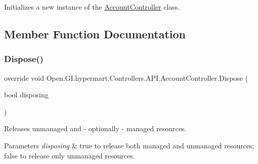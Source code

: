 Initializes a new instance of the \hyperlink{class_open_1_1_g_i_1_1hypermart_1_1_controllers_1_1_a_p_i_1_1_account_controller}{Account\+Controller} class. 



\subsection{Member Function Documentation}
\hypertarget{class_open_1_1_g_i_1_1hypermart_1_1_controllers_1_1_a_p_i_1_1_account_controller_a92393dd7d9b1c1d8f2f762ee31fbdd3d}{}\label{class_open_1_1_g_i_1_1hypermart_1_1_controllers_1_1_a_p_i_1_1_account_controller_a92393dd7d9b1c1d8f2f762ee31fbdd3d} 
\subsubsection{\texorpdfstring{Dispose()}{Dispose()}}
{\footnotesize\ttfamily override void Open.\+G\+I.\+hypermart.\+Controllers.\+A\+P\+I.\+Account\+Controller.\+Dispose (\begin{DoxyParamCaption}\item[{bool}]{disposing }\end{DoxyParamCaption})\hspace{0.3cm}{\ttfamily [protected]}}



Releases unmanaged and -\/ optionally -\/ managed resources. 


\begin{DoxyParams}{Parameters}
{\em disposing} & {\ttfamily true} to release both managed and unmanaged resources; {\ttfamily false} to release only unmanaged resources.\\
\hline
\end{DoxyParams}
\hypertarget{class_open_1_1_g_i_1_1hypermart_1_1_controllers_1_1_a_p_i_1_1_account_controller_af7539d8bf4d884854d63a75733ce93e9}{}\label{class_open_1_1_g_i_1_1hypermart_1_1_controllers_1_1_a_p_i_1_1_account_controller_af7539d8bf4d884854d63a75733ce93e9} 
